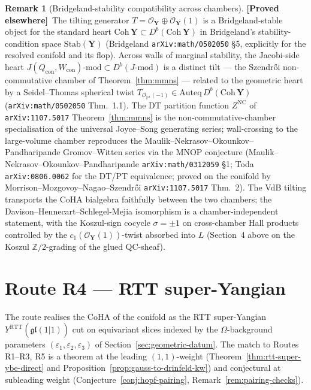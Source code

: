 \documentclass[11pt]{amsart}
\theoremstyle{definition}
\newtheorem{remark}[theorem]{Remark}
\providecommand{\bY}{\mathbf{Y}}
\providecommand{\cO}{\mathcal{O}}
\providecommand{\bZ}{\mathbb{Z}}
\providecommand{\bP}{\mathbb{P}}
\providecommand{\fgl}{\mathfrak{gl}}
\providecommand{\ClaimStatusProvedElsewhere}{\textbf{\textsf{[Proved elsewhere]}}}
\begin{document}
\begin{remark}[Bridgeland-stability compatibility across chambers]
\label{rem:vdb-bridgeland}
\ClaimStatusProvedElsewhere\
The tilting generator $T = \cO_\bY \oplus \cO_\bY(1)$ is a
Bridgeland-stable object for the standard heart
$\mathrm{Coh}\,\bY \subset D^b(\mathrm{Coh}\,\bY)$ in Bridgeland's
stability-condition space $\mathrm{Stab}(\bY)$ (Bridgeland
\texttt{arXiv:math/0502050} \S5, explicitly for the resolved conifold
and its flop). Across walls of marginal stability, the Jacobi-side
heart $J(Q_{\mathrm{con}}, W_{\mathrm{con}})\text{-mod} \subset
D^b(J\text{-mod})$ is a distinct tilt --- the Szendr\H{o}i
non-commutative chamber of Theorem~\ref{thm:mmns} --- related to the
geometric heart by a Seidel--Thomas spherical twist $T_{\cO_{\bP^1}(-1)}
\in \mathrm{Auteq}\, D^b(\mathrm{Coh}\,\bY)$
(\texttt{arXiv:math/0502050} Thm.~1.1). The DT partition function
$Z^{\mathrm{NC}}$ of \texttt{arXiv:1107.5017} Theorem~\ref{thm:mmns} is
the non-commutative-chamber specialisation of the universal Joyce--Song
generating series; wall-crossing to the large-volume chamber reproduces
the Maulik--Nekrasov--Okounkov--Pandharipande Gromov--Witten series via
the MNOP conjecture (Maulik--Nekrasov--Okounkov--Pandharipande
\texttt{arXiv:math/0312059} \S1; Toda \texttt{arXiv:0806.0062} for the
DT/PT equivalence; proved on the conifold by
Morrison--Mozgovoy--Nagao--Szendr\H{o}i \texttt{arXiv:1107.5017}
Thm.~2). The VdB tilting transports the CoHA bialgebra faithfully
between the two chambers; the Davison--Hennecart--Schlegel-Mejia
isomorphism is a chamber-independent statement, with the Koszul-sign
cocycle $\sigma = \pm 1$ on cross-chamber Hall products controlled by
the $c_1(\cO_\bY(1))$-twist absorbed into $L$ (Section~4 above on the
Koszul $\bZ/2$-grading of the glued QC-sheaf).
\end{remark}

\section{Route R4 --- RTT super-Yangian}
\label{sec:rtt-route}

The route realises the CoHA of the conifold as the RTT super-Yangian
$Y^{\mathrm{RTT}}(\widehat{\fgl}(1|1))$ cut on equivariant slices indexed
by the $\Omega$-background parameters $(\varepsilon_1, \varepsilon_2,
\varepsilon_3)$ of Section~\ref{sec:geometric-datum}. The match to Routes
R1--R3, R5 is a theorem at the leading $(1,1)$-weight
(Theorem~\ref{thm:rtt-super-ybe-direct} and
Proposition~\ref{prop:gauss-to-drinfeld-kw}) and conjectural at subleading
weight (Conjecture~\ref{conj:hopf-pairing},
Remark~\ref{rem:pairing-checks}).
\end{document}
